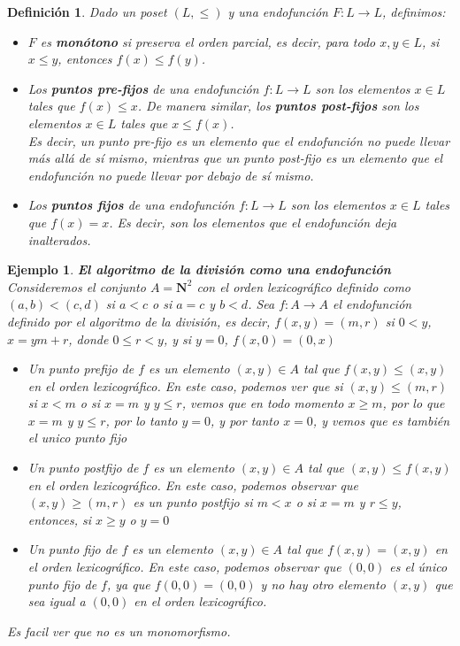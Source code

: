 \documentclass[executivepaper]{article}
\newtheorem{defi}[propo]{Definición}
\newtheorem{ejemplo}[propo]{Ejemplo}
\begin{document}
\begin{defi}
    Dado un poset $(L, \leq)$ y una endofunción $F: L \rightarrow L$, definimos:
    \begin{itemize}
        \item $F$ es \textbf{monótono} si preserva el orden parcial, es decir, para todo $x, y \in L$, si $x \leq y$, entonces $f(x) \leq f(y)$.
        \item Los \textbf{puntos pre-fijos} de una endofunción $f: L \rightarrow L$ son los elementos $x \in L$ tales que $f(x) \leq x$. De manera similar, los \textbf{puntos post-fijos} son los elementos $x \in L$ tales que $x \leq f(x)$.\\ 
        Es decir, un punto pre-fijo es un elemento que el endofunción no puede llevar más allá de sí mismo, mientras que un punto post-fijo es un elemento que el endofunción no puede llevar por debajo de sí mismo.
        \item Los \textbf{puntos fijos} de una endofunción $f: L \rightarrow L$ son los elementos $x \in L$ tales que $f(x) = x$. Es decir, son los elementos que el endofunción deja inalterados.
    \end{itemize} 
\end{defi}

\begin{ejemplo}\textbf{El algoritmo de la división como una endofunción}\\
    Consideremos el conjunto $A = \mathbf{N}^2$ con el orden lexicográfico definido como $(a,b) < (c,d)$ si $a < c$ o si $a = c$ y $b < d$. Sea $f: A \rightarrow A$ el endofunción definido por el algoritmo de la división, es decir, $f(x,y) = (m,r)$ si $0 < y$, $x = ym + r$, donde $0 \leq r < y$, y si $y=0$, $f(x,0) = (0,x)$ 

    \begin{itemize}
        \item Un punto prefijo de $f$ es un elemento $(x,y) \in A$ tal que $f(x,y) \leq (x,y)$ en el orden lexicográfico. En este caso, podemos ver que si $(x,y)\leq(m,r)$ si $x < m$ o si $x = m$ y $y \leq r$, vemos que en todo momento $x \geq m$, por lo que $x = m$ y $y \leq r$, por lo tanto $y = 0$, y por tanto $x = 0$, y vemos que es también el unico punto fijo
        \item Un punto postfijo de $f$ es un elemento $(x,y) \in A$ tal que $(x,y) \leq f(x,y)$ en el orden lexicográfico. En este caso, podemos observar que $(x,y)\geq(m,r)$ es un punto postfijo si $m < x$ o si $x = m$ y $r \leq y$, entonces, si $x \geq y$ o $y = 0$
        \item Un punto fijo de $f$ es un elemento $(x,y) \in A$ tal que $f(x,y) = (x,y)$ en el orden lexicográfico. En este caso, podemos observar que $(0,0)$ es el único punto fijo de $f$, ya que $f(0,0) = (0,0)$ y no hay otro elemento $(x,y)$ que sea igual a $(0,0)$ en el orden lexicográfico.
    \end{itemize}
    Es facil ver que no es un monomorfismo.
\end{ejemplo}
\end{document}
